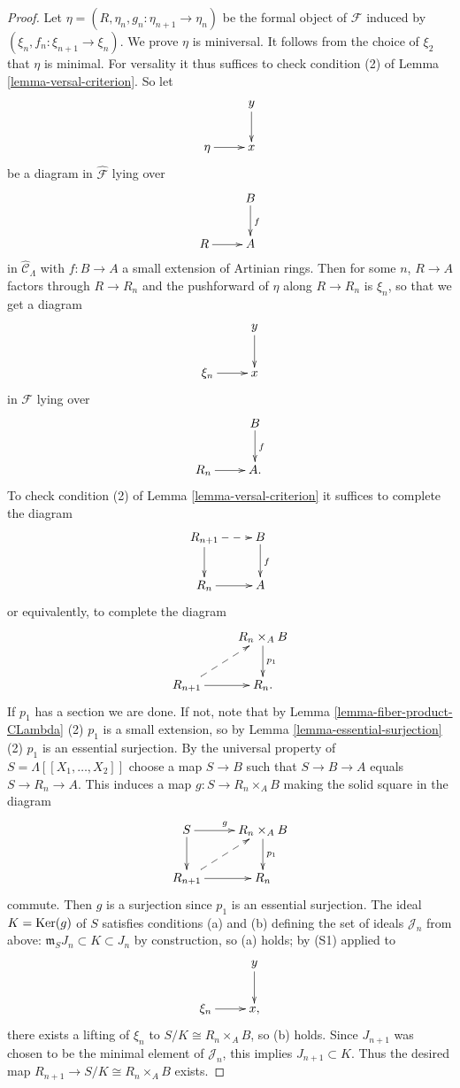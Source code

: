 \begin{proof}
\medskip \noindent
Let $\eta = (R, \eta_{n}, g_n: \eta_{n+1} \rightarrow \eta_{n})$ be the formal 
object of $\mathcal F$ induced by $(\xi_{n}, f_{n}: \xi_{n+1} \rightarrow 
\xi_{n})$. We prove $\eta$ is miniversal. It follows from the choice of 
$\xi_{2}$ that $\eta$ is minimal.  For versality it thus suffices to check 
condition (2) of Lemma \ref{lemma-versal-criterion}.  So let
\[
\xymatrix{
            &  y \ar[d] \\
\eta \ar[r]  &  x
}
\]
be a diagram in $\widehat{\mathcal F}$ lying over
\[
\xymatrix{
         &   B  \ar[d]^{f} \\
R \ar[r] &   A 
}
\]
in $\widehat{\mathcal C}_{\Lambda}$ with $f: B \rightarrow A$ a small extension 
of Artinian rings. Then for some $n$, $R \rightarrow A$ factors through $R 
\rightarrow R_{n}$ and the pushforward of $\eta$ along $R \rightarrow R_n$ is 
$\xi_{n}$, so that we get a diagram
\[
\xymatrix{
            &  y \ar[d] \\
\xi_{n} \ar[r]  &  x
}
\]
in $\mathcal F$ lying over
\[
\xymatrix{
         &   B  \ar[d]^{f} \\
R_n \ar[r] &   A .
}
\]
To check condition (2) of Lemma \ref{lemma-versal-criterion} it suffices to 
complete the diagram
\[
\xymatrix{
R_{n+1} \ar[d] \ar@{-->}[r] & B \ar[d]^{f} \\
R_{n}   \ar[r] & A 
}
\]
or equivalently, to complete the diagram
\[
\xymatrix{
  &  R_{n} \times_{A} B \ar[d]^{p_1} \\
R_{n+1} \ar@{-->}[ur] \ar[r] &  R_{n} .
}
\]
If $p_1$ has a section we are done.  If not, note that by Lemma 
\ref{lemma-fiber-product-CLambda} (2) $p_1$ is a small extension, so by Lemma 
\ref{lemma-essential-surjection} (2) $p_1$ is an essential surjection. By the 
universal property of $S = \Lambda[[X_1, \dots, X_2]]$ choose a map $S 
\rightarrow B$ such that $S \rightarrow B \rightarrow A$ equals $S \rightarrow 
R_{n} \rightarrow A$.  This induces a map $g: S \rightarrow R_{n} \times_{A} B$ 
making the solid square in the diagram
\[
\xymatrix{
S \ar[d] \ar[r]^{g}  &  R_{n} \times_{A} B \ar[d]^{p_1} \\
R_{n+1} \ar@{-->}[ur] \ar[r] &  R_{n}
}
\]
commute. Then $g$ is a surjection since $p_1$ is an essential surjection. The 
ideal $K = \textnormal{Ker}(g)$ of $S$ satisfies conditions (a) and (b) 
defining the set of ideals $\mathcal J_n$ from above: $\mathfrak{m}_SJ_n 
\subset K \subset J_n$ by construction, so (a) holds; by \textnormal{(S1)} 
applied to
\[
\xymatrix{
            &  y \ar[d] \\
\xi_{n} \ar[r]  &  x,
}
\]
there exists a lifting of $\xi_n$ to $S/K \cong R_{n} \times_{A} B$, so (b) 
holds.  Since $J_{n+1}$ was chosen to be the minimal element of $\mathcal J_n$, 
this implies $J_{n+1} \subset K$.  Thus the desired map $R_{n+1} \rightarrow 
S/K \cong R_{n} \times_{A} B$ exists.
\end{proof}


